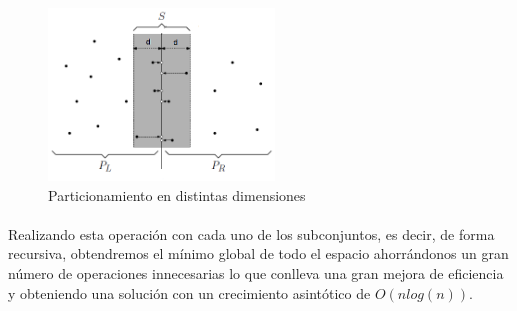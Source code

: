 \documentclass{article}
\begin{document}
			\begin{figure}[ht!]
				\centering
				\includegraphics[width=60mm]{strip_closesr1.png}
				\caption{Particionamiento en distintas dimensiones \label{example_border}}
			\end{figure}


	\paragraph{}
	Realizando esta operación con cada uno de los subconjuntos, es decir, de forma recursiva,  obtendremos el mínimo global de todo el espacio ahorrándonos un gran número de operaciones innecesarias lo que conlleva una gran mejora de eficiencia y obteniendo una solución con un crecimiento asintótico de $O(nlog(n))$.
\end{document}

